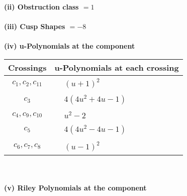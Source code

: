 \documentclass[1p]{elsarticle_modified}
\theoremstyle{definition}
\begin{document}
\flushleft \textbf{(ii) Obstruction class $= 1$}\\~\\
\flushleft \textbf{(iii) Cusp Shapes $= -8$}\\~\\
\newpage\renewcommand{\arraystretch}{1}
\flushleft \textbf{(iv) u-Polynomials at the component}\newline \\
\begin{tabular}{m{50pt}|m{274pt}}
Crossings & \hspace{64pt}u-Polynomials at each crossing \\
\hline $$\begin{aligned}c_{1},c_{2},c_{11}\end{aligned}$$&$\begin{aligned}
&(u+1)^2
\end{aligned}$\\
\hline $$\begin{aligned}c_{3}\end{aligned}$$&$\begin{aligned}
&4(4 u^2+4 u-1)
\end{aligned}$\\
\hline $$\begin{aligned}c_{4},c_{9},c_{10}\end{aligned}$$&$\begin{aligned}
&u^2-2
\end{aligned}$\\
\hline $$\begin{aligned}c_{5}\end{aligned}$$&$\begin{aligned}
&4(4 u^2-4 u-1)
\end{aligned}$\\
\hline $$\begin{aligned}c_{6},c_{7},c_{8}\end{aligned}$$&$\begin{aligned}
&(u-1)^2
\end{aligned}$\\
\hline
\end{tabular}\\~\\
\newpage\renewcommand{\arraystretch}{1}
\flushleft \textbf{(v) Riley Polynomials at the component}\newline \\
\end{document}
